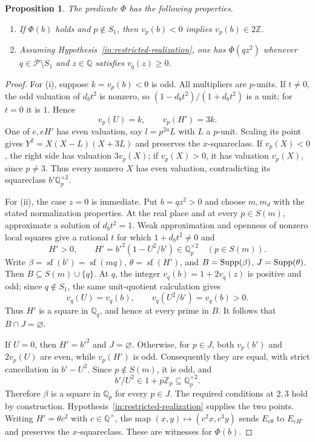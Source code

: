 \documentclass[11pt]{article}
\newtheorem{proposition}[theorem]{Proposition}
\theoremstyle{definition}\newtheorem{inputthm}[theorem]{Hypothesis}
\theoremstyle{remark}\newtheorem{remark}[theorem]{Remark}
\newcommand{\Q}{\mathbb Q}\newcommand{\Z}{\mathbb Z}
\begin{document}
\begin{proposition}\label{prop:restricted-parity}
The predicate $\Phi$ has the following properties.
\begin{enumerate}[label=\textup{(\roman*)}]
\item If $\Phi(b)$ holds and $p\notin S_1$, then $v_p(b)<0$
implies $v_p(b)\in2\Z$.
\item Assuming Hypothesis~\ref{in:restricted-realization}, one has
$\Phi(qz^2)$ whenever $q\in\mathscr P\setminus S_1$ and
$z\in\Q$ satisfies $v_q(z)\ge0$.
\end{enumerate}
\end{proposition}
\begin{proof}
For (i), suppose $k=v_p(b)<0$ is odd. All multipliers are $p$-units.
If $t\ne0$, the odd valuation of $d_bt^2$ is nonzero, so
$(1-d_bt^2)/(1+d_bt^2)$ is a unit; for $t=0$ it is $1$.
Hence
\[
 v_p(U)=k,\qquad v_p(H')=3k.
\]
One of $e,eH'$ has even valuation, say $l=p^{2a}L$ with $L$ a
$p$-unit. Scaling its point gives
$Y^2=X(X-L)(X+3L)$ and preserves the $x$-squareclass.
If $v_p(X)<0$, the right side has valuation $3v_p(X)$; if
$v_p(X)>0$, it has valuation $v_p(X)$, since $p\ne3$.
Thus every nonzero $X$ has even valuation, contradicting its
squareclass $b'\Q_p^{\times2}$.

For (ii), the case $z=0$ is immediate. Put $b=qz^2>0$ and choose
$m,m_d$ with the stated normalization properties. At the real place
and at every $p\in S(m)$, approximate a solution of $d_bt^2=1$.
Weak approximation and openness of nonzero local squares give a
rational $t$ for which $1+d_bt^2\ne0$ and
\[
 H'>0,\qquad
 H'=b'^2(1-U^2/b')\in\Q_p^{\times2}\quad(p\in S(m)).
\]
Write $\beta=\operatorname{sf}(b')=\operatorname{sf}(mq)$,
$\theta=\operatorname{sf}(H')$, and $B=\operatorname{Supp}(\beta)$,
$J=\operatorname{Supp}(\theta)$. Then $B\subseteq S(m)\cup\{q\}$.
At $q$, the integer $v_q(b)=1+2v_q(z)$ is positive and odd;
since $q\notin S_1$, the same unit-quotient calculation gives
\[
 v_q(U)=v_q(b),\qquad v_q(U^2/b')=v_q(b)>0.
\]
Thus $H'$ is a square in $\Q_q$, and hence at every prime in $B$.
It follows that $B\cap J=\varnothing$.

If $U=0$, then $H'=b'^2$ and $J=\varnothing$. Otherwise, for
$p\in J$, both $v_p(b')$ and $2v_p(U)$ are even, while
$v_p(H')$ is odd. Consequently they are equal, with strict
cancellation in $b'-U^2$. Since $p\notin S(m)$, it is odd, and
\[
                       b'/U^2\in1+p\Z_p\subseteq\Q_p^{\times2}.
\]
Therefore $\beta$ is a square in $\Q_p$ for every $p\in J$.
The required conditions at $2,3$ hold by construction.
Hypothesis~\ref{in:restricted-realization} supplies the two points.
Writing $H'=\theta c^2$ with $c\in\Q^\times$, the map
$(x,y)\mapsto(c^2x,c^3y)$ sends $E_{e\theta}$ to $E_{eH'}$
and preserves the $x$-squareclass. These are witnesses for $\Phi(b)$.
\end{proof}
\end{document}
